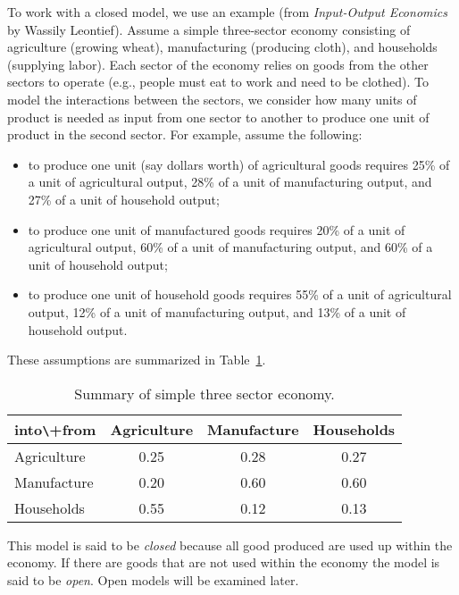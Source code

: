 To work with a closed model, we use an example (from \emph{Input-Output Economics} by Wassily Leontief). Assume a simple three-sector economy consisting of agriculture (growing wheat), manufacturing (producing cloth), and households (supplying labor). Each sector of the economy relies on goods from the other sectors to operate (e.g., people must eat to work and need to be clothed). To model the interactions between the sectors, we consider how many units of product is needed as input from one sector to another to produce one unit of product in the second sector. For example, assume the following:
\begin{itemize}
\item to produce one unit (say dollars worth) of agricultural goods requires 25\% of a unit of agricultural output, 28\% of a unit of manufacturing output, and 27\% of a unit of household output;
\item to produce one unit of manufactured goods requires 20\% of a unit of agricultural output, 60\% of a unit of manufacturing output, and 60\% of a unit of household output;
\item to produce one unit of household goods requires 55\% of a unit of agricultural output, 12\% of a unit of manufacturing output, and 13\% of a unit of household output.
\end{itemize}
These assumptions are summarized in Table~\ref{T:ThreeSectorTable}.

\begin{table}[h]
\begin{center}
\begin{tabular}{l | c c c } \\
into\verb+\+from    &Agriculture    & Manufacture   &Households \\ \hline
Agriculture         &0.25           &0.28           &0.27 \\
Manufacture         &0.20           &0.60           &0.60 \\
Households          &0.55           &0.12           &0.13 \\
\end{tabular}
\end{center}
\caption{Summary of simple three sector economy.}
\label{T:ThreeSectorTable}
\end{table}
This model is said to be \emph{closed} because all good produced are used up within the economy.  If there are goods that are not used within the economy the model is said to be \emph{open}. Open models will be examined later.


